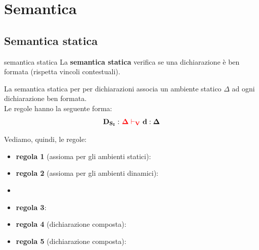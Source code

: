\section{Semantica}

\subsection{Semantica statica}
\begin{mydef}{semantica statica}
    La \textbf{semantica statica} verifica se una dichiarazione è ben formata (rispetta vincoli contestuali).
\end{mydef}

La semantica statica per per dichiarazioni associa un ambiente statico $\Delta$ ad ogni dichiarazione ben formata.\\[0.2ex]
Le regole hanno la seguente forma:
\[
    \mathbf{D_{S_I}:} \ \textcolor{red}{\mathbf{\Delta \vdash_\mathbf{V}}} \ \mathbf{d : \Delta}
\]


Vediamo, quindi, le regole:
\begin{itemize}[label=$\triangleright$, itemsep=\smallskipamount]
    \item \textbf{regola 1} (assioma per gli ambienti statici):
    \item \textbf{regola 2} (assioma per gli ambienti dinamici):
    \item {}
    \item \textbf{regola 3}:
    \item \textbf{regola 4} (dichiarazione composta):
    \item \textbf{regola 5} (dichiarazione composta):
\end{itemize}

